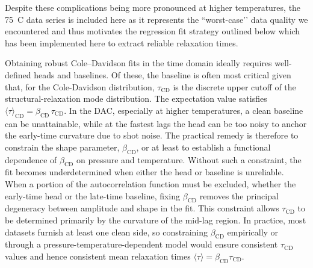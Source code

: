 Despite these complications being more pronounced at higher temperatures, the 75~\textdegree C data series is included here as it represents the “worst-case’’ data quality we encountered and thus motivates the regression fit strategy outlined below which has been implemented here to extract reliable relaxation times.

Obtaining robust Cole–Davidson fits in the time domain ideally requires well-defined heads and baselines. Of these, the baseline is often most critical given that, for the Cole-Davidson distribution, $\tau_{\mathrm{CD}}$ is the discrete upper cutoff of the structural-relaxation mode distribution. The expectation value satisfies $\langle \tau \rangle_{\mathrm{CD}}=\beta_{\mathrm{CD}}\,\tau_{\mathrm{CD}}$. In the DAC, especially at higher temperatures, a clean baseline can be unattainable, while at the fastest lags the head can be too noisy to anchor the early-time curvature due to shot noise. The practical remedy is therefore to constrain the shape parameter, $\beta_{\mathrm{CD}}$, or at least to establish a functional dependence of $\beta_{\mathrm{CD}}$ on pressure and temperature. Without such a constraint, the fit becomes underdetermined when either the head or baseline is unreliable. When a portion of the autocorrelation function must be excluded, whether the early-time head or the late-time baseline, fixing $\beta_{\mathrm{CD}}$ removes the principal degeneracy between amplitude and shape in the fit. This constraint allows $\tau_{\mathrm{CD}}$ to be determined primarily by the curvature of the mid-lag region. In practice, most datasets furnish at least one clean side, so constraining $\beta_{\mathrm{CD}}$ empirically or through a pressure-temperature-dependent model would ensure consistent $\tau_{\mathrm{CD}}$ values and hence consistent mean relaxation times $\langle \tau \rangle = \beta_{\mathrm{CD}}\tau_{\mathrm{CD}}$.

